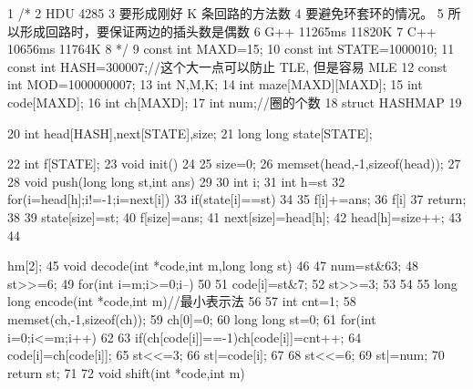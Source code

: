 \documentclass[11pt]{article}
\begin{document}
\begin{Code}
 1   /*
 2   HDU 4285
 3   要形成刚好 K 条回路的方法数
 4   要避免环套环的情况。
 5   所以形成回路时，要保证两边的插头数是偶数
 6   G++ 11265ms 11820K
 7   C++ 10656ms 11764K
 8   */
 9   const int MAXD=15;
10   const int STATE=1000010;
11   const int HASH=300007;//这个大一点可以防止 TLE, 但是容易 MLE
12   const int MOD=1000000007;
13   int N,M,K;
14   int maze[MAXD][MAXD];
15   int code[MAXD];
16   int ch[MAXD];
17   int num;//圈的个数
18   struct HASHMAP
19   {
20       int head[HASH],next[STATE],size;
21       long long state[STATE];


22       int f[STATE];
23       void init()
24       {
25           size=0;
26           memset(head,-1,sizeof(head));
27       }
28       void push(long long st,int ans)
29       {
30           int i;
31           int h=st%
32           for(i=head[h];i!=-1;i=next[i])
33             if(state[i]==st)
34             {
35                  f[i]+=ans;
36                  f[i]%
37                  return;
38             }
39           state[size]=st;
40           f[size]=ans;
41           next[size]=head[h];
42           head[h]=size++;
43       }
44   }hm[2];
45   void decode(int *code,int m,long long st)
46   {
47       num=st&63;
48       st>>=6;
49       for(int i=m;i>=0;i--)
50       {
51           code[i]=st&7;
52           st>>=3;
53       }
54   }
55   long long encode(int *code,int m)//最小表示法
56   {
57       int cnt=1;
58       memset(ch,-1,sizeof(ch));
59       ch[0]=0;
60       long long st=0;
61       for(int i=0;i<=m;i++)
62       {
63           if(ch[code[i]]==-1)ch[code[i]]=cnt++;
64           code[i]=ch[code[i]];
65           st<<=3;
66           st|=code[i];
67       }
68       st<<=6;
69       st|=num;
70       return st;
71   }
72   void shift(int *code,int m)



\end{Code}
\end{document}
